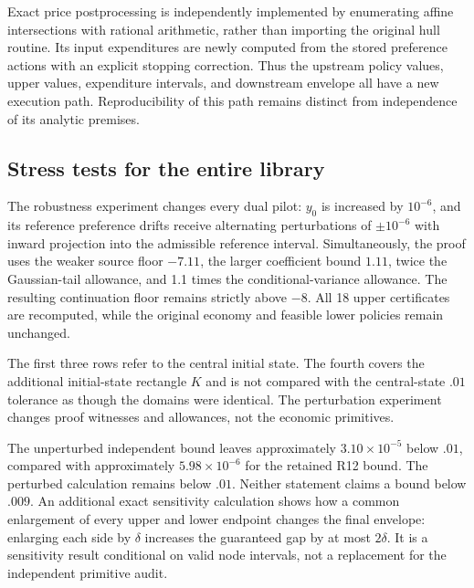 Exact price postprocessing is independently implemented by enumerating affine intersections with rational arithmetic, rather than importing the original hull routine. Its input expenditures are newly computed from the stored preference actions with an explicit stopping correction. Thus the upstream policy values, upper values, expenditure intervals, and downstream envelope all have a new execution path. Reproducibility of this path remains distinct from independence of its analytic premises.

\subsection{Stress tests for the entire library}
The robustness experiment changes every dual pilot: $y_0$ is increased by $10^{-6}$, and its reference preference drifts receive alternating perturbations of $\pm10^{-6}$ with inward projection into the admissible reference interval. Simultaneously, the proof uses the weaker source floor $-7.11$, the larger coefficient bound $1.11$, twice the Gaussian-tail allowance, and 1.1 times the conditional-variance allowance. The resulting continuation floor remains strictly above $-8$. All 18 upper certificates are recomputed, while the original economy and feasible lower policies remain unchanged.

\begin{table}[t]\centering\small
\caption{Continuum certificates under independent verification and perturbation}\label{tab:robustness}

\par\smallskip\footnotesize The first three rows refer to the central initial state. The fourth covers the additional initial-state rectangle $K$ and is not compared with the central-state $.01$ tolerance as though the domains were identical. The perturbation experiment changes proof witnesses and allowances, not the economic primitives.
\end{table}

The unperturbed independent bound leaves approximately $3.10\times10^{-5}$ below $.01$, compared with approximately $5.98\times10^{-6}$ for the retained R12 bound. The perturbed calculation remains below $.01$. Neither statement claims a bound below $.009$. An additional exact sensitivity calculation shows how a common enlargement of every upper and lower endpoint changes the final envelope: enlarging each side by $\delta$ increases the guaranteed gap by at most $2\delta$. It is a sensitivity result conditional on valid node intervals, not a replacement for the independent primitive audit.

